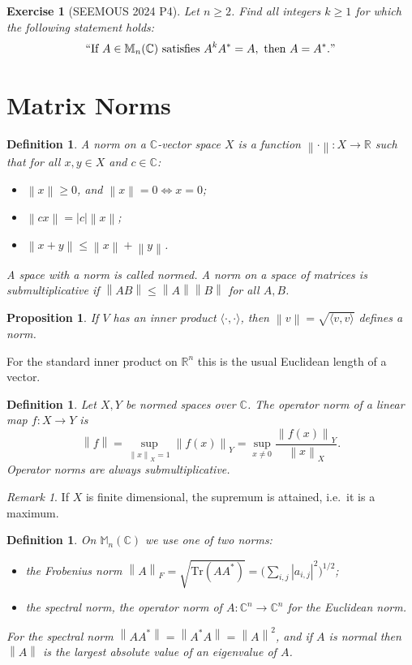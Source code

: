 \documentclass[12pt]{article}
\newcommand{\norm}[1]{\left\lVert #1 \right\rVert}
\renewcommand{\Tr}{\mathrm{Tr}}
\theoremstyle{breakplain}
\newtheorem{prop}[theorem]{Proposition}
\theoremstyle{breakdef}
\newtheorem{definition}[theorem]{Definition}
\newtheorem{ex}[subsubsection]{Exercise}
\theoremstyle{remark}
\newtheorem*{remark}{Remark}
\begin{document}
\begin{ex}[SEEMOUS 2024 P4]\label{S24P4}
    Let $n\geq 2$. Find all integers $k\geq1$ for which the following statement holds:
    \[\textup{``If }A\in \mathbb{M}_n(\mathbb{C})\text{ satisfies } A^kA^*=A, \text{ then } A=A^*.\textup{''} \]
\end{ex}

\newpage
\section{Matrix Norms}
\begin{definition}
    A \emph{norm} on a $\mathbb{C}$-vector space $X$ is a function $\norm{\cdot} : X\to \mathbb{R}$ such that for all $x,y\in X$ and $c\in\mathbb{C}$:
    \begin{itemize}
        \item $\norm{x}\geq 0$, and $\norm{x}=0\iff x=0$;
        \item $\norm{cx}=|c|\norm{x}$;
        \item $\norm{x+y}\leq \norm{x}+\norm{y}$.
    \end{itemize}
    A space with a norm is called \emph{normed}. A norm on a space of matrices is \emph{submultiplicative} if $\norm{AB}\leq \norm{A}\norm{B}$ for all $A,B$.
\end{definition}
\begin{prop}
    If $V$ has an inner product $\langle\cdot,\cdot\rangle$, then $\norm{v}=\sqrt{\langle v,v \rangle}$ defines a norm.
\end{prop}
For the standard inner product on $\mathbb{R}^n$ this is the usual Euclidean length of a vector.
\begin{definition}
    Let $X,Y$ be normed spaces over $\mathbb{C}$. The \emph{operator norm} of a linear map $f:X\to Y$ is
    \[\norm{f}=\sup_{\norm{x}_X=1}\norm{f(x)}_Y=\sup_{x\neq 0} \frac{\norm{f(x)}_Y}{\norm{x}_X}.\]
    Operator norms are always submultiplicative.
\end{definition}
\begin{remark}
    If $X$ is finite dimensional, the supremum is attained, i.e.\ it is a maximum.
\end{remark}
\begin{definition}
    On $\mathbb{M}_n(\mathbb{C})$ we use one of two norms:
    \begin{itemize}
        \item the \emph{Frobenius norm} $\norm{A}_F=\sqrt{\Tr(AA^*)}=\big(\sum_{i,j}|a_{i,j}|^2\big)^{1/2}$;
        \item the \emph{spectral norm}, the operator norm of $A:\mathbb{C}^n\to \mathbb{C}^n$ for the Euclidean norm.
    \end{itemize}
    For the spectral norm $\norm{AA^*}=\norm{A^*A}=\norm{A}^2$, and if $A$ is normal then $\norm{A}$ is the largest absolute value of an eigenvalue of $A$.
\end{definition}
\end{document}
